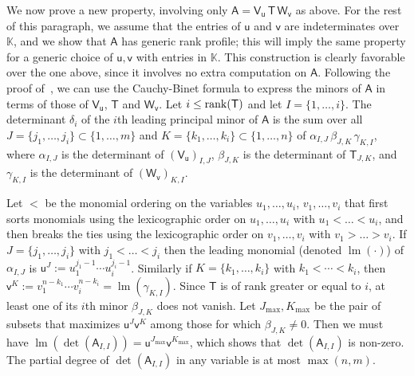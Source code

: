\documentclass[sigconf]{acmart}
\newcommand{\vu}{\ensuremath{\mathsf{u}}}
\newcommand{\vv}{\ensuremath{\mathsf{v}}}
\newcommand{\mA}{\ensuremath{\mathsf{A}}}
\newcommand{\mT}{\ensuremath{\mathsf{T}}}
\newcommand{\mV}{\ensuremath{\mathsf{V}}}
\newcommand{\mW}{\ensuremath{\mathsf{W}}}
\newcommand{\K}{\ensuremath{\mathbb{K}}}
\newcommand{\lm}{\ensuremath{\operatorname{lm}}}
\newcommand{\todo}[1]{(\textbf{todo:} #1)}
\theoremstyle{acmdefinition}
\begin{document}
\smallskip

We now prove a new property, involving only
$\mA = \mV_\vu\, \mT\, \mW_\vv$ as above. For the rest of this
paragraph, we assume that the entries of $\vu$ and $\vv$ are
indeterminates over $\K$, and we show that $\mA$ has generic rank
profile; this will imply the same property for a generic choice of
$\vu,\vv$ with entries in $\K$. This construction is clearly favorable
over the one above, since it involves no extra computation on $\mA$.
Following the proof of~\cite[Theorem~5.6.2]{Pan01}, we can use the
Cauchy-Binet formula to express the minors of $\mA$ in terms of those
of $\mV_\vu$, $\mT$ and $\mW_\vv$. Let $i \le {\rm rank}(\mT)$ and let
$I=\{1,\dots,i\}$. The determinant $\delta_i$ of the $i$th leading
principal minor of $\mA$ is the sum over all
$J=\{j_1,\dots,j_i\} \subset \{1,\dots,m\}$ and
$K=\{k_1,\dots,k_i\} \subset \{1,\dots,n\}$ of
$\alpha_{I,J}\, \beta_{J,K}\, \gamma_{K,I}$, where $\alpha_{I,J}$ is
the determinant of $(\mV_\vu)_{I,J}$, $\beta_{J,K}$ is the determinant
of $\mT_{J,K}$, and $\gamma_{K,I}$ is the determinant of
$(\mW_\vv)_{K,I}$.

Let $<$ be the monomial ordering on the variables $u_1,\dots,u_i$,
$v_1,\dots,v_i$ that first sorts monomials using the lexicographic order on
$u_1,\dots,u_i$ with $u_1 < \dots < u_i$, and then breaks the ties using the
lexicographic order on $v_1,\dots,v_i$ with $v_1 > \dots > v_i$. If
$J=\{j_1,\dots,j_i\}$ with $j_1 < \dots < j_i$ then the leading monomial
(denoted $\lm(\cdot)$) of $\alpha_{I,J}$ is
$\vu^J := u_1^{j_1-1} \cdots u_i^{j_i-1}$.  Similarly if $K=\{k_1,\dots,k_i\}$
with $k_1 < \cdots < k_i$, then
$\vv^K := v_1^{n-k_1} \cdots v_i^{n-k_i}=\lm(\gamma_{K,I})$. Since $\mT$ is of
rank greater or equal to $i$, at least one of its $i$th minor $\beta_{J,K}$ does
not vanish. Let $J_{\max},K_{\max}$ be the pair of subsets that maximizes
$\vu^J \vv^K$ among those for which $\beta_{J,K} \neq 0$. Then we must have
$\lm(\det(\mA_{I,I})) = \vu^{J_{\max}} \vv^{K_{\max}}$, which shows that
$\det(\mA_{I,I})$ is non-zero. The partial degree of $\det(\mA_{I,I})$ in any variable
 is at most $\max(n,m)$. 



\vspace{-5px}
\end{document}
